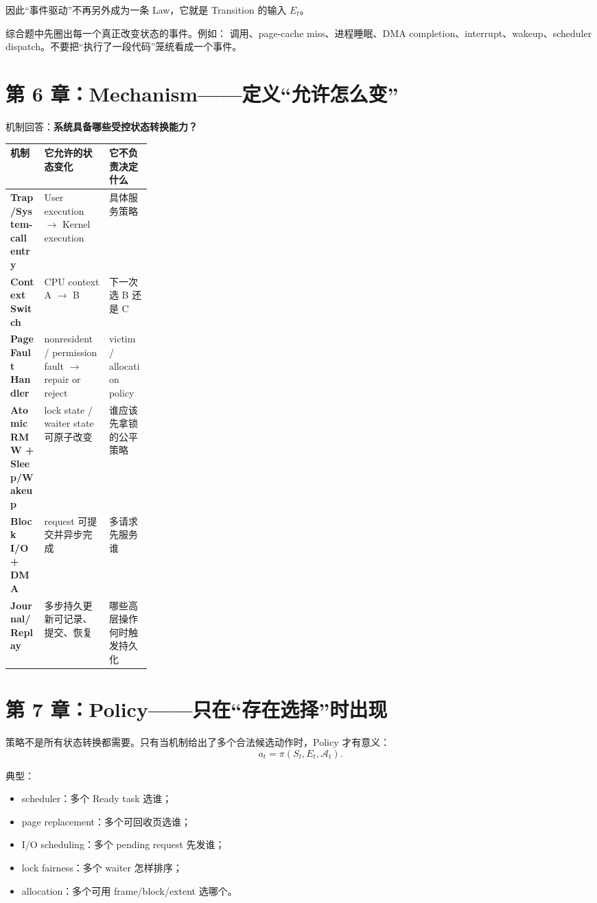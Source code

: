 \documentclass[11pt,a4paper]{ctexart}
\newcommand{\kw}[1]{\textbf{#1}}
\newcommand{\code}[1]{\texttt{\detokenize{#1}}}
\begin{document}
因此“事件驱动”不再另外成为一条 Law，它就是 Transition 的输入 $E_t$。

\begin{method}[事件识别法]
综合题中先圈出每一个真正改变状态的事件。例如：\code{read()} 调用、page-cache miss、进程睡眠、DMA completion、interrupt、wakeup、scheduler dispatch。不要把“执行了一段代码”笼统看成一个事件。
\end{method}

\section{第 6 章：Mechanism——定义“允许怎么变”}

机制回答：\kw{系统具备哪些受控状态转换能力？}

\begin{center}
\scriptsize
\renewcommand{\arraystretch}{1.25}
\begin{tabularx}{\linewidth}{>{\bfseries}p{0.24\linewidth} Y Y}
\toprule
机制 & 它允许的状态变化 & 它不负责决定什么 \\
\midrule
Trap/System-call entry & User execution $\to$ Kernel execution & 具体服务策略 \\
Context Switch & CPU context A $\to$ B & 下一次选 B 还是 C \\
Page Fault Handler & nonresident / permission fault $\to$ repair or reject & victim / allocation policy \\
Atomic RMW + Sleep/Wakeup & lock state / waiter state 可原子改变 & 谁应该先拿锁的公平策略 \\
Block I/O + DMA & request 可提交并异步完成 & 多请求先服务谁 \\
Journal/Replay & 多步持久更新可记录、提交、恢复 & 哪些高层操作何时触发持久化 \\
\bottomrule
\end{tabularx}
\end{center}

\section{第 7 章：Policy——只在“存在选择”时出现}

策略不是所有状态转换都需要。只有当机制给出了多个合法候选动作时，Policy 才有意义：
\[
\boxed{a_t=\pi(S_t,E_t,\mathcal A_t)}.
\]

典型：
\begin{itemize}
  \item scheduler：多个 Ready task 选谁；
  \item page replacement：多个可回收页选谁；
  \item I/O scheduling：多个 pending request 先发谁；
  \item lock fairness：多个 waiter 怎样排序；
  \item allocation：多个可用 frame/block/extent 选哪个。
\end{itemize}
\end{document}
